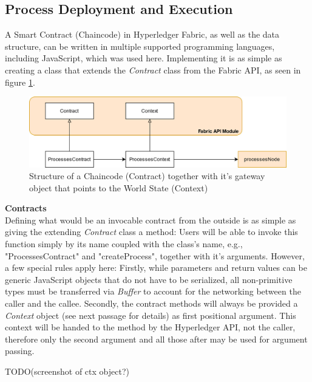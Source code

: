 \subsection{Process Deployment and Execution}
\label{sec:impr:hl:chaincode}

A Smart Contract (Chaincode) in Hyperledger Fabric, as well as the data structure, can be written in multiple supported programming languages, including JavaScript, which was used here. Implementing it is as simple as creating a class that extends the \emph{Contract} class from the Fabric API, as seen in figure \ref{fig:impr:hl:contract}.

\begin{figure}[h]
	\centering
	\captionsetup{justification=centering,margin=2cm}
	\includegraphics[width=\textwidth]{gfx/hl-contract}
	\caption{Structure of a Chaincode (Contract) together with it's gateway object that points to the World State (Context)}
	\label{fig:impr:hl:contract}
\end{figure}

\textbf{Contracts} \\[0.2em]
Defining what would be an invocable contract from the outside is as simple as giving the extending \emph{Contract} class a method: Users will be able to invoke this function simply by its name coupled with the class's name, e.g., "ProcessesContract" and "createProcess", together with it's arguments. However, a few special rules apply here: Firstly, while parameters and return values can be generic JavaScript objects that do not have to be serialized, all non-primitive types must be transferred via \emph{Buffer} to account for the networking between the caller and the callee. Secondly, the contract methods will always be provided a \emph{Context} object (see next passage for details) as first positional argument. This context will be handed to the method by the Hyperledger API, not the caller, therefore only the second argument and all those after may be used for argument passing.

TODO(screenshot of ctx object?)

